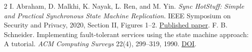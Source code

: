 \documentclass[11pt,a4paper]{article}
\begin{document}
\begin{thebibliography}{2}\small
{}
I. Abraham, D. Malkhi, K. Nayak, L. Ren, and M. Yin.
\emph{Sync HotStuff: Simple and Practical Synchronous State Machine
Replication}. IEEE Symposium on Security and Privacy, 2020, Section II,
Figures 1--2.
\href{https://conferences.computer.org/sp/pdfs/sp/2020/349700a106.pdf}{Published paper}.
F. B. Schneider. Implementing fault-tolerant services using the state
machine approach: A tutorial. \emph{ACM Computing Surveys} 22(4),
299--319, 1990. \href{https://doi.org/10.1145/98163.98167}{DOI}.
\end{thebibliography}
\end{document}

